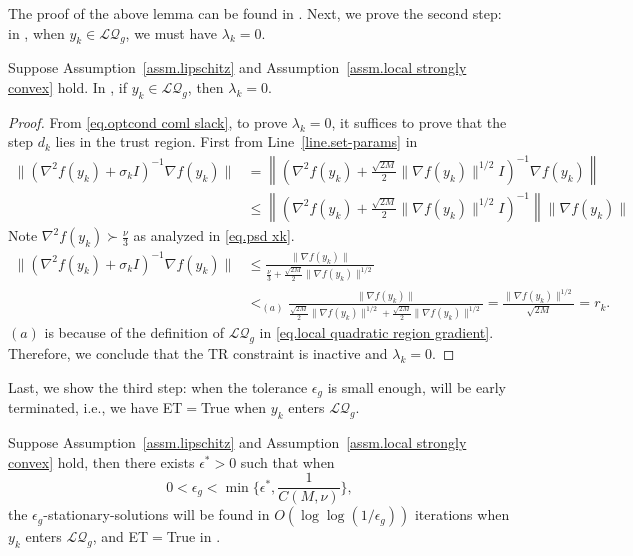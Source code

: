 \documentclass{article}
\begin{document}
The proof of the above lemma can be found in .
Next, we prove the second step: in , when $y_k\in\mathcal{LQ}_g$, we must have $\lambda_k=0$.
\begin{lemma}
    \label{lem.detection of local quadratic}
    Suppose Assumption~\ref{assm.lipschitz} and Assumption~\ref{assm.local strongly convex} hold. In , if $y_k\in\mathcal{LQ}_g$, then $\lambda_k=0$.
\end{lemma}
\begin{proof}
    From \eqref{eq.optcond coml slack}, to prove $\lambda_k=0$, it suffices to prove that the step $d_k$ lies in the trust region. First from Line~\ref{line.set-params} in 
    \begin{equation*}
        \begin{aligned}
            \|(\nabla^2 f(y_k)+\sigma_k I)^{-1}\nabla f(y_k)\| & = \left\|\left (\nabla^2 f(y_k)+\frac{\sqrt{2M}}{2} \|\nabla f(y_k)\|^{1/2} I\right)^{-1}\nabla f(y_k)\right\|         \\
                                                               & \leq \left\|\left (\nabla^2 f(y_k)+\frac{\sqrt{2M}}{2} \|\nabla f(y_k)\|^{1/2} I\right)^{-1}\right\| \|\nabla f(y_k)\|
        \end{aligned}
    \end{equation*}
    Note $\nabla^2 f(y_k)\succ \frac{\nu}{3}$ as analyzed in \eqref{eq.psd xk}.
    \begin{equation*}
        \begin{aligned}
            \|(\nabla^2 f(y_k)+\sigma_k I)^{-1}\nabla f(y_k)\| & \leq \frac{\|\nabla f(y_k)\|}{\frac{\nu}{3}+\frac{\sqrt{2M}}{2} \|\nabla f(y_k)\|^{1/2}} \\&<_{(a)} \frac{\|\nabla f(y_k)\|}{\frac{\sqrt{2M}}{2}\|\nabla f(y_k)\|^{1/2}+\frac{\sqrt{2M}}{2} \|\nabla f(y_k)\|^{1/2}} =\frac{\|\nabla f(y_k)\|^{1/2}}{\sqrt{2M}} =r_k.
        \end{aligned}
    \end{equation*}
    $(a)$ is because of the definition of $\mathcal{LQ}_g$ in \eqref{eq.local quadratic region gradient}. Therefore, we conclude that the TR constraint is inactive and $\lambda_k=0$.
\end{proof}
Last, we show the third step: when the tolerance $\epsilon_g$ is small enough,  will be early terminated, i.e., we have ET$=$True when $y_k$ enters $\mathcal{LQ}_g$.
\begin{theorem}
    \label{thm.local quadratic convergence}
    Suppose Assumption~\ref{assm.lipschitz} and Assumption~\ref{assm.local strongly convex} hold, then there exists $\epsilon^* >0$ such that when
    \begin{equation}
        \label{eq.regularity epsilon}
        0<\epsilon_g< \min\{\epsilon^*, \frac{1}{C(M,\nu)}\},
    \end{equation}
    the $\epsilon_g$-stationary-solutions will be found in $O\left(\log\log\left(1/\epsilon_g\right)\right)$ iterations when $y_k$ enters $\mathcal{LQ}_g$, and ET$=$True in .
\end{theorem}
\end{document}

